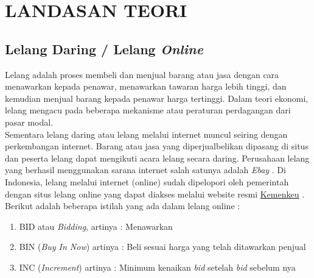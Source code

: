 \chapter{LANDASAN TEORI}{}
  \section{Lelang Daring / Lelang \textit{Online}}
   Lelang adalah proses membeli dan menjual barang atau jasa dengan cara menawarkan kepada penawar, menawarkan tawaran harga lebih tinggi, dan kemudian menjual barang kepada penawar harga tertinggi. Dalam teori ekonomi, lelang mengacu pada beberapa mekanisme atau peraturan perdagangan dari pasar modal. \\
	Sementara lelang daring atau lelang melalui internet muncul seiring dengan perkembangan internet. Barang atau jasa yang diperjualbelikan dipasang di situs dan peserta lelang dapat mengikuti acara lelang secara daring. Perusahaan lelang yang berhasil menggunakan sarana internet salah satunya adalah \textit{Ebay} . Di Indonesia, lelang melalui internet (online) sudah dipelopori oleh pemerintah dengan situs lelang online yang dapat diakses melalui website resmi \href{https://www.lelangdjkn.kemenkeu.go.id}{Kemenkeu} \cite{wikipedia_lelang_2016} . 
    Berikut adalah beberapa istilah yang ada dalam lelang online :
    \begin{enumerate}
	\item BID atau \textit{Bidding}, artinya : Menawarkan
    \item BIN (\textit{Buy In Now}) artinya : Beli sesuai harga yang telah ditawarkan penjual
    \item INC (\textit{Increment}) artinya : Minimum kenaikan \textit{bid} setelah \textit{bid} sebelum nya \cite{noauthor_arti_nodate}
    \end{enumerate}
    
